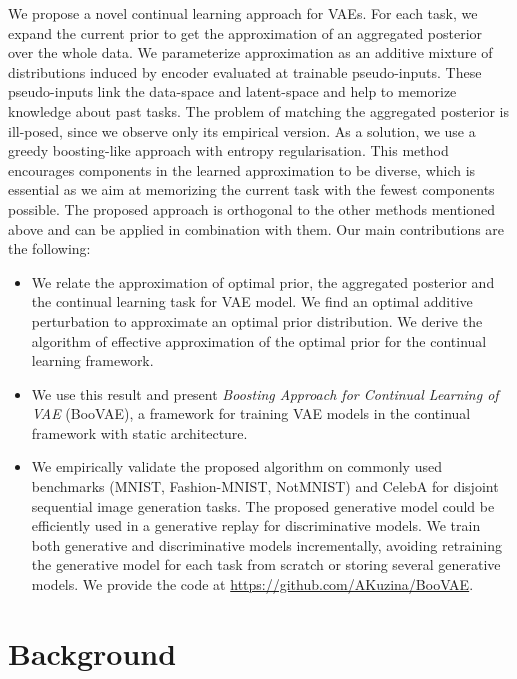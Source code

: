 We propose a novel continual learning approach for VAEs. For each task, we expand the current prior to get the approximation of an aggregated posterior over the whole data. We parameterize approximation as an additive mixture of distributions induced by encoder evaluated at trainable pseudo-inputs. These pseudo-inputs link the data-space and latent-space and help to memorize knowledge about past tasks. The problem of matching the aggregated posterior is ill-posed, since we observe only its empirical version. As a solution, we use a greedy boosting-like approach with entropy regularisation. This method encourages components in the learned approximation to be diverse, which is essential as we aim at memorizing the current task with the fewest components possible. The proposed approach is orthogonal to the other methods mentioned above and can be applied in combination with them.
Our main contributions are the following:
\begin{itemize}
    \item We relate the approximation of optimal prior, the aggregated posterior and the continual learning task for VAE model. We find an optimal additive perturbation to approximate an optimal prior distribution. We derive the algorithm of effective approximation of the optimal prior for the continual learning framework.
    \item We use this result and present \textit{Boosting Approach for Continual Learning of VAE} (BooVAE), a framework for training VAE models in the continual framework with static architecture.
    \item We empirically validate the proposed algorithm on commonly used benchmarks (MNIST, Fashion-MNIST, NotMNIST) and CelebA for disjoint sequential image generation tasks. The proposed generative model could be efficiently used in a generative replay for discriminative models. We train both generative and discriminative models incrementally, avoiding retraining the generative model for each task from scratch or storing several generative models. We provide the code at \url{https://github.com/AKuzina/BooVAE}.
\end{itemize}
\section{Background}
\label{background}
